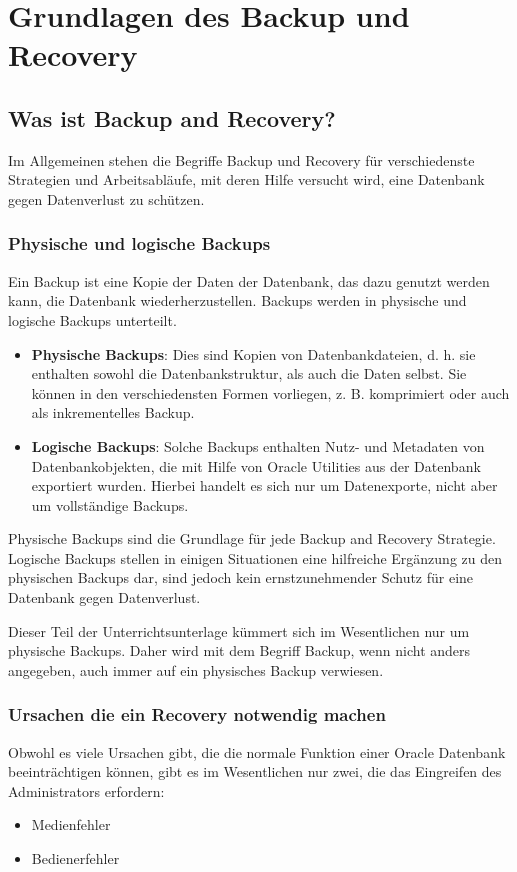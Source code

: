   \chapter{Grundlagen des Backup und Recovery}
    \setcounter{page}{1}
    \minitoc
\newpage
    \section{Was ist Backup and Recovery?}
      Im Allgemeinen stehen die Begriffe Backup und Recovery f\"ur verschiedenste Strategien und Arbeitsabl\"aufe, mit deren Hilfe versucht wird, eine Datenbank gegen Datenverlust zu sch\"utzen.
      \subsection{Physische und logische Backups}
        Ein Backup ist eine Kopie der Daten der Datenbank, das dazu genutzt werden kann, die Datenbank wiederherzustellen. Backups werden in physische und logische Backups unterteilt.
        \begin{itemize}
          \item \textbf{Physische Backups}: Dies sind Kopien von Datenbankdateien, d. h. sie enthalten sowohl die Datenbankstruktur, als auch die Daten selbst. Sie k\"onnen in den verschiedensten Formen vorliegen, z. B. komprimiert oder auch als inkrementelles Backup.
          \item \textbf{Logische Backups}: Solche Backups enthalten Nutz- und Metadaten von Datenbank\-objekten, die mit Hilfe von Oracle Utilities aus der Datenbank exportiert wurden. Hierbei handelt es sich nur um Datenexporte, nicht aber um vollst\"andige Backups.
        \end{itemize}
        Physische Backups sind die Grundlage f\"ur jede Backup and Recovery Strategie. Logische Backups stellen in einigen Situationen eine hilfreiche Erg\"anzung zu den physischen Backups dar, sind jedoch kein ernstzunehmender Schutz f\"ur eine Datenbank gegen Datenverlust.

        Dieser Teil der Unterrichtsunterlage k\"ummert sich im Wesentlichen nur um physische Backups. Daher wird mit dem Begriff Backup, wenn nicht anders angegeben, auch immer auf ein physisches Backup verwiesen.
      \subsection{Ursachen die ein Recovery notwendig machen}
        Obwohl es viele Ursachen gibt, die die normale Funktion einer Oracle Datenbank beeintr\"achtigen k\"onnen, gibt es im Wesentlichen nur zwei, die das Eingreifen des Administrators erfordern:
        \begin{itemize}
          \item Medienfehler
          \item Bedienerfehler
        \end{itemize}
